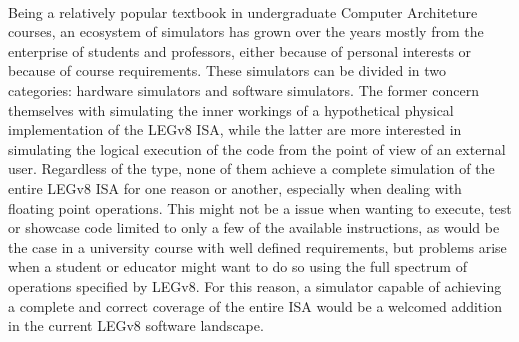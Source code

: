 \paragraph{}
Being a relatively popular textbook in undergraduate Computer Architeture courses, an ecosystem of simulators has grown over the years mostly from the enterprise of students and professors, either because of personal interests or because of course requirements. These simulators can be divided in two categories: hardware simulators and software simulators. The former concern themselves with simulating the inner workings of a hypothetical physical implementation of the LEGv8 ISA, while the latter are more interested in simulating the logical execution of the code from the point of view of an external user. Regardless of the type, none of them achieve a complete simulation of the entire LEGv8 ISA for one reason or another, especially when dealing with floating point operations. This might not be a issue when wanting to execute, test or showcase code limited to only a few of the available instructions, as would be the case in a university course with well defined requirements, but problems arise when a student or educator might want to do so using the full spectrum of operations specified by LEGv8. For this reason, a simulator capable of achieving a complete and correct coverage of the entire ISA would be a welcomed addition in the current LEGv8 software landscape.

